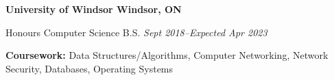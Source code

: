 \textbf{University of Windsor \hfill Windsor, ON} \par
Honours Computer Science B.S. \hfill \textit{Sept 2018--Expected Apr 2023}\par
\textbf{Coursework:} Data Structures/Algorithms, Computer Networking, Network Security, Databases, Operating Systems
